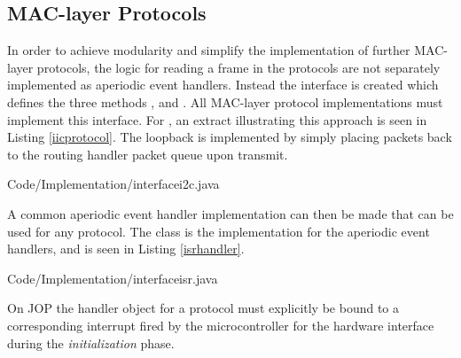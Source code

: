 \subsection{MAC-layer Protocols} %
\label{sub:mac_layer_protocols}
In order to achieve modularity and simplify the implementation of further MAC-layer protocols, the logic for reading a frame in the protocols are not separately implemented as aperiodic event handlers. Instead the interface  is created which defines the three methods ,  and . All MAC-layer protocol implementations must implement this interface. For \iic, an extract illustrating this approach is seen in Listing \ref{iicprotocol}. The loopback is implemented by simply placing packets back to the routing handler packet queue upon transmit.

{Code/Implementation/interfacei2c.java}

A common aperiodic event handler implementation can then be made that can be used for any protocol. The class  is the implementation for the aperiodic event handlers, and is seen in Listing \ref{isrhandler}.

{Code/Implementation/interfaceisr.java}

On JOP the handler object for a protocol must explicitly be bound to a corresponding interrupt fired by the microcontroller for the hardware interface during the \textit{initialization} phase.

